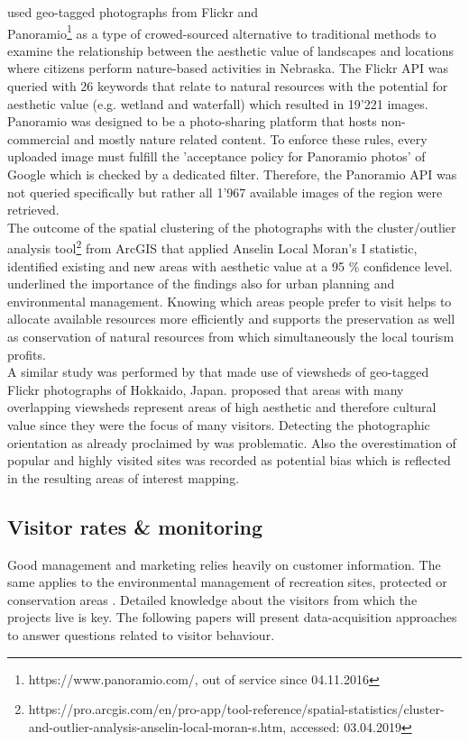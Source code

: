 \textcite{Figueroa-Alfaro2017} used geo-tagged photographs from Flickr and \\ Panoramio\footnote{https://www.panoramio.com/, out of service since 04.11.2016} as a type of crowed-sourced alternative to traditional methods to examine the relationship between the aesthetic value of landscapes and locations where citizens perform nature-based activities in Nebraska. The Flickr API was queried with 26 keywords that relate to natural resources with the potential for aesthetic value (e.g. wetland and waterfall) which resulted in 19'221 images. Panoramio was designed to be a photo-sharing platform that hosts non-commercial and mostly nature related content. To enforce these rules, every uploaded image must fulfill the 'acceptance policy for Panoramio photos' of Google which is checked by a dedicated filter. Therefore, the Panoramio API was not queried specifically but rather all 1'967 available images of the region were retrieved.\\
The outcome of the spatial clustering of the photographs with the cluster/outlier analysis tool\footnote{https://pro.arcgis.com/en/pro-app/tool-reference/spatial-statistics/cluster-and-outlier-analysis-anselin-local-moran-s.htm, accessed: 03.04.2019} from ArcGIS that applied Anselin Local Moran's I statistic, identified existing and new areas with aesthetic value at a 95 \% confidence level. \citeauthor{Figueroa-Alfaro2017} underlined the importance of the findings also for urban planning and environmental management. Knowing which areas people prefer to visit helps to allocate available resources more efficiently and supports the preservation as well as conservation of natural resources from which simultaneously the local tourism profits. \\
\newline
A similar study was performed by \textcite{Yoshimura2017} that made use of viewsheds of geo-tagged Flickr photographs of Hokkaido, Japan. \citeauthor{Yoshimura2017} proposed that areas with many overlapping viewsheds represent areas of high aesthetic and therefore cultural value since they were the focus of many visitors. Detecting the photographic orientation as already proclaimed by \textcite{Unknown2013} was problematic. Also the overestimation of popular and highly visited sites was recorded as potential bias which is reflected in the resulting areas of interest mapping.


\subsection{Visitor rates \& monitoring}
Good management and marketing relies heavily on customer information. The same applies to the environmental management of recreation sites, protected or conservation areas \parencite{Ralf1991}. Detailed knowledge about the visitors from which the projects live is key. The following papers will present data-acquisition approaches to answer questions related to visitor behaviour. \\  

